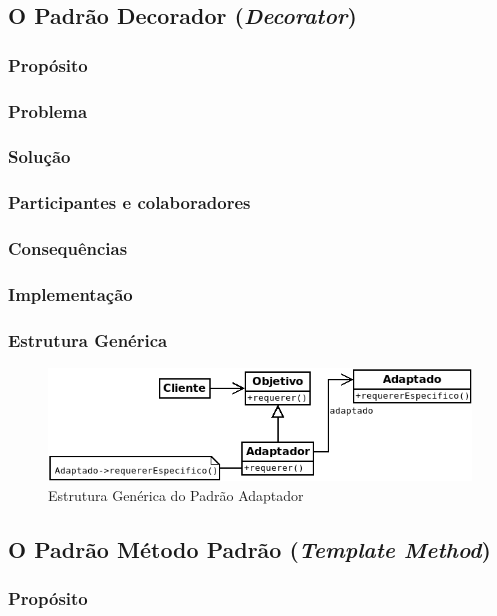 \subsection{O Padrão Decorador (\textit{Decorator})}
\subsubsection{Propósito}
\subsubsection{Problema}
\subsubsection{Solução}
\subsubsection{Participantes e colaboradores}
\subsubsection{Consequências}
\subsubsection{Implementação}
\subsubsection{Estrutura Genérica}

\begin{figure}[h]
\begin{center}
\includegraphics[scale=0.6]{adaptador.png}
\caption{Estrutura Genérica do Padrão Adaptador}\label{fig:adaptador}
\end{center}
\end{figure}

\subsection{O Padrão Método Padrão (\textit{Template Method})}
\subsubsection{Propósito}
